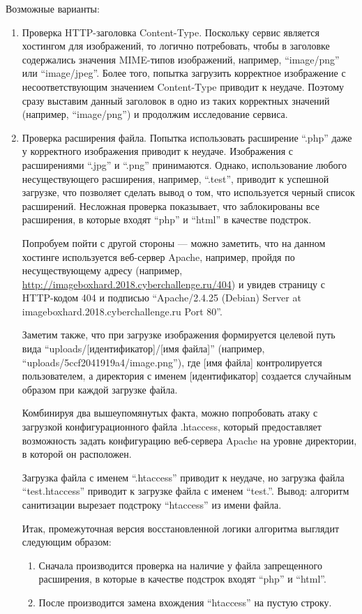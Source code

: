 Возможные варианты:
\begin{enumerate}
    \item Проверка HTTP-заголовка Content-Type. Поскольку сервис является хостингом для изображений, то логично потребовать, чтобы в заголовке содержались значения MIME-типов изображений, например, “image/png” или “image/jpeg”. Более того, попытка загрузить корректное изображение с несоответствующим значением Content-Type приводит к неудаче. Поэтому сразу выставим данный заголовок в одно из таких корректных значений (например, “image/png”) и продолжим исследование сервиса.
    \item Проверка расширения файла. Попытка использовать расширение “.php” даже у корректного изображения приводит к неудаче. Изображения с расширениями “.jpg” и “.png” принимаются. Однако, использование любого несуществующего расширения, например, “.test”, приводит к успешной загрузке, что позволяет сделать вывод о том, что используется черный список расширений. Несложная проверка показывает, что заблокированы все расширения, в которые входят “php” и “html” в качестве подстрок. 
    
    Попробуем пойти с другой стороны — можно заметить, что на данном хостинге используется веб-сервер Apache, например, пройдя по несуществующему адресу (например, \url{http://imageboxhard.2018.cyberchallenge.ru/404}) и увидев страницу с HTTP-кодом 404 и подписью “Apache/2.4.25 (Debian) Server at imageboxhard.2018.cyberchallenge.ru Port 80”.

    Заметим также, что при загрузке изображения формируется целевой путь вида “uploads/[идентификатор]/[имя файла]” (например, “uploads/5ccf2041919a4/image.png”), где [имя файла] контролируется пользователем, а директория с именем [идентификатор] создается случайным образом при каждой загрузке файла.

    Комбинируя два вышеупомянутых факта, можно попробовать атаку с загрузкой конфигурационного файла .htaccess, который предоставляет возможность задать конфигурацию веб-сервера Apache на уровне директории, в которой он расположен.

    Загрузка файла с именем “.htaccess” приводит к неудаче, но загрузка файла “test.htaccess” приводит к загрузке файла с именем “test.”. Вывод: алгоритм санитизации вырезает подстроку “htaccess” из имени файла.

    Итак, промежуточная версия восстановленной логики алгоритма выглядит следующим образом:
    \begin{enumerate}
        \item Сначала производится проверка на наличие у файла запрещенного расширения, в которые в качестве подстрок входят “php” и “html”.
        \item После производится замена вхождения “htaccess” на пустую строку.
    \end{enumerate}
    

\end{enumerate}
